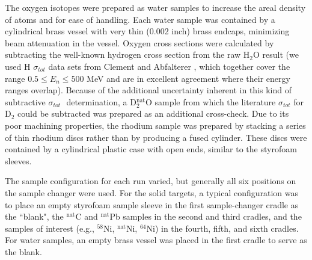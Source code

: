 \documentclass[twocolumn,secnumarabic,amssymb, nobibnotes, aps, prl,
superscriptaddress, nobalancelastpage]{revtex4}
\newcommand{\tots}{\ensuremath{\sigma_{tot}}\,\,}
\begin{document}
The oxygen isotopes were prepared as water samples to increase the areal density
of atoms and for ease of handling. Each water sample was contained by a
cylindrical brass vessel with very thin (0.002 inch) brass endcaps, minimizing
beam attenuation in the vessel. Oxygen cross sections were calculated by
subtracting the well-known hydrogen cross section from the raw H$_{2}$O result
(we used H \tots data sets from Clement \cite{Clement1972} and Abfalterer 
\cite{Abfalterer2001}, which together cover the range $0.5 \leq E_n \leq 500$ MeV
and are in excellent agreement where their energy ranges overlap). Because of
the additional uncertainty inherent in this kind of subtractive \tots
determination, a D$_{2}^{\text{nat}}$O sample from which the literature \tots for
D$_{2}$ could be subtracted was prepared as an additional cross-check. Due to its poor 
machining properties, the rhodium
sample was prepared by stacking a series of thin rhodium discs rather than by
producing a fused cylinder. These discs were contained by a cylindrical plastic
case with open ends, similar to the styrofoam sleeves.

The sample configuration for each run varied, but generally all six positions on
the sample changer were used. For the solid targets, a typical configuration was
to place an empty styrofoam sample sleeve in the first sample-changer cradle as
the ``blank", the $^{\text{nat}}$C and $^{\text{nat}}$Pb samples in the second and third
cradles, and the samples of interest (e.g., $^{58}$Ni, $^{\text{nat}}$Ni, $^{64}$Ni) in
the fourth, fifth, and sixth cradles. For water samples, an empty brass vessel
was placed in the first cradle to serve as the blank.
\end{document}
